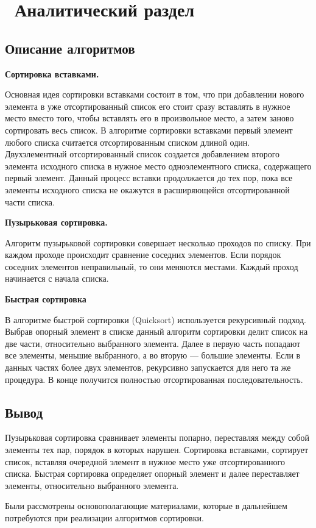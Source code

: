 
\chapter{ Аналитический раздел}
\label{cha:analysis}

\section{Описание алгоритмов}


\textbf{Сортировка вставками.}

Основная идея сортировки вставками состоит в том, что при добавлении нового элемента в уже отсортированный список его стоит сразу
вставлять в нужное место вместо того, чтобы вставлять его в произвольное место, а затем заново сортировать весь список.
В алгоритме сортировки вставками первый элемент любого списка считается отсортированным списком длиной один.
Двухэлементный отсортированный список создается добавлением второго элемента исходного списка в нужное место одноэлементного списка, содержащего первый элемент. 
Данный процесс вставки продолжается до тех пор, 
пока все элементы исходного списка не окажутся в расширяющейся отсортированной части списка.

\textbf{Пузырьковая сортировка.}

Алгоритм пузырьковой сортировки совершает несколько проходов по списку. 
При каждом проходе происходит сравнение соседних элементов. 
Если порядок соседних элементов неправильный, то они меняются местами.
Каждый проход начинается с начала списка. 


\textbf{Быстрая сортировка}

В алгоритме быстрой сортировки (Quicksort) используется рекурсивный подход.
Выбрав опорный элемент в списке данный алгоритм сортировки делит список на две части, относительно выбранного элемента.
Далее в первую часть попадают все элементы, меньшие выбранного, а во вторую — большие элементы. 
Если в данных частях более двух элементов, рекурсивно запускается для него та же процедура. 
В конце получится полностью отсортированная последовательность.

\section{Вывод}

Пузырьковая сортировка сравнивает элементы попарно, переставляя между собой элементы тех пар, порядок в которых нарушен.
Сортировка вставками, сортирует список, вставляя очередной элемент в нужное место уже отсортированного списка.
Быстрая сортировка определяет опорный элемент и далее переставляет элементы, относительно выбранного элемента.

Были рассмотрены основополагающие материалами, которые в дальнейшем потребуются при реализации алгоритмов сортировки.  



